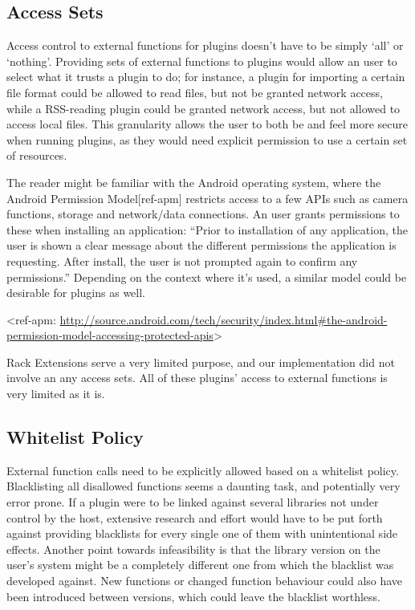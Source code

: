 \subsection {Access Sets}

Access control to external functions for plugins doesn't have to be simply `all'
or `nothing'.
Providing sets of external functions to plugins would allow an user to select
what it trusts a plugin to do; for instance, a plugin for importing a certain
file format could be allowed to read files, but not be granted network access,
while a RSS-reading plugin could be granted network access, but not allowed to
access local files.
This granularity allows the user to both be and feel more secure when running
plugins, as they would need explicit permission to use a certain set of
resources.

The reader might be familiar with the Android operating system, where the
Android Permission Model[ref-apm] restricts access to a few APIs such as camera
functions, storage and network/data connections.
An user grants permissions to these when installing an application: ``Prior to
installation of any application, the user is shown a clear message about the
different permissions the application is requesting.
After install, the user is not prompted again to confirm any permissions.''
Depending on the context where it's used, a similar model could be desirable for
plugins as well.

<ref-apm: \url{http://source.android.com/tech/security/index.html#the-android-permission-model-accessing-protected-apis}>

Rack Extensions serve a very limited purpose, and our implementation did not
involve an any access sets.
All of these plugins' access to external functions is very limited as it is.

\subsection {Whitelist Policy}

External function calls need to be explicitly allowed based on a whitelist
policy.
Blacklisting all disallowed functions seems a daunting task, and potentially
very error prone.
If a plugin were to be linked against several libraries not under control by the
host, extensive research and effort would have to be put forth against providing
blacklists for every single one of them with unintentional side effects.
Another point towards infeasibility is that the library version on the user's
system might be a completely different one from which the blacklist was
developed against.
New functions or changed function behaviour could also have been introduced
between versions, which could leave the blacklist worthless.

